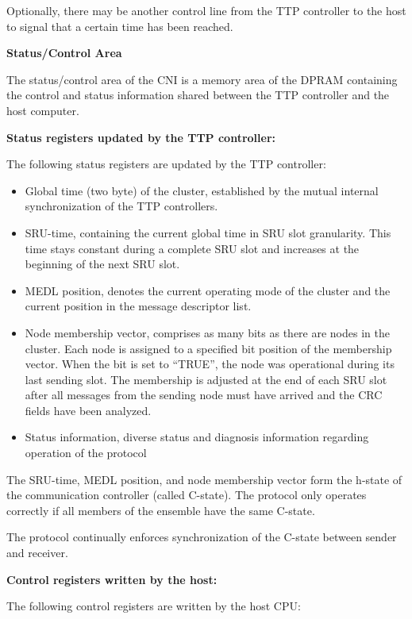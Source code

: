 Optionally, there may be another control line from the TTP controller to
the host to signal that a certain time has been reached.

\textbf{Status/Control Area}

The status/control area of the CNI is a memory area of the DPRAM
containing the control and status information shared between the TTP
controller and the host computer.

\textbf{Status registers updated by the TTP controller:}

The following status registers are updated by the TTP controller:

\begin{itemize}
\item
  Global time (two byte) of the cluster, established by the mutual
  internal synchronization of the TTP controllers.
\item
  SRU-time, containing the current global time in SRU slot granularity.
  This time stays constant during a complete SRU slot and increases at
  the beginning of the next SRU slot.
\item
  MEDL position, denotes the current operating mode of the cluster and
  the current position in the message descriptor list.
\item
  Node membership vector, comprises as many bits as there are nodes in
  the cluster. Each node is assigned to a specified bit position of the
  membership vector. When the bit is set to ``TRUE'', the node was
  operational during its last sending slot. The membership is adjusted
  at the end of each SRU slot after all messages from the sending node
  must have arrived and the CRC fields have been analyzed.
\item
  Status information, diverse status and diagnosis information regarding
  operation of the protocol
\end{itemize}

The SRU-time, MEDL position, and node membership vector form the h-state
of the communication controller (called C-state). The protocol only
operates correctly if all members of the ensemble have the same C-state.

The protocol continually enforces synchronization of the C-state between
sender and receiver.

\textbf{Control registers written by the host:}

The following control registers are written by the host CPU:

